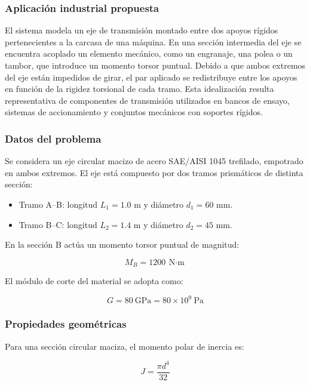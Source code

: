 \documentclass[12pt,a4paper]{article}
\begin{document}
\subsubsection*{Aplicación industrial propuesta}

El sistema modela un eje de transmisión montado entre dos apoyos rígidos pertenecientes a la carcasa de una máquina. En una sección intermedia del eje se encuentra acoplado un elemento mecánico, como un engranaje, una polea o un tambor, que introduce un momento torsor puntual. Debido a que ambos extremos del eje están impedidos de girar, el par aplicado se redistribuye entre los apoyos en función de la rigidez torsional de cada tramo. Esta idealización resulta representativa de componentes de transmisión utilizados en bancos de ensayo, sistemas de accionamiento y conjuntos mecánicos con soportes rígidos.

\subsubsection*{Datos del problema}

Se considera un eje circular macizo de acero SAE/AISI 1045 trefilado, empotrado en ambos extremos. El eje está compuesto por dos tramos prismáticos de distinta sección:

\begin{itemize}
    \item Tramo A--B: longitud $L_1 = 1.0$ m y diámetro $d_1 = 60$ mm.
    \item Tramo B--C: longitud $L_2 = 1.4$ m y diámetro $d_2 = 45$ mm.
\end{itemize}

En la sección B actúa un momento torsor puntual de magnitud:

\[
M_B = 1200\ \text{N$\cdot$m}
\]

El módulo de corte del material se adopta como:

\[
G = 80\ \text{GPa} = 80\times10^9\ \text{Pa}
\]

\subsubsection*{Propiedades geométricas}

Para una sección circular maciza, el momento polar de inercia es:

\begin{equation}
J=\frac{\pi d^4}{32}
\end{equation}
\end{document}
